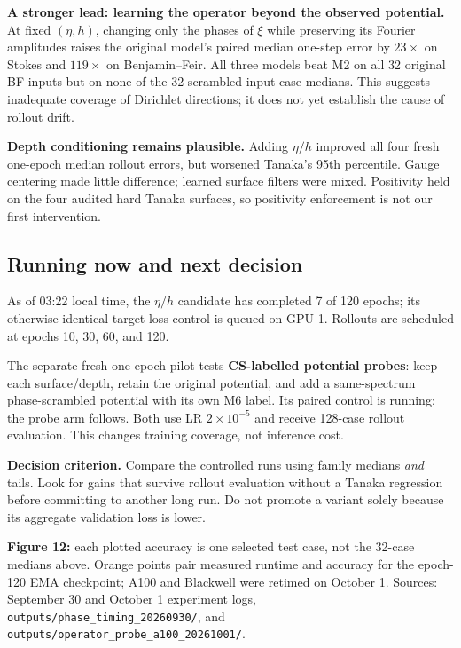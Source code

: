 \documentclass[10pt]{article}
\begin{document}
\textbf{A stronger lead: learning the operator beyond the observed potential.}
At fixed $(\eta,h)$, changing only the phases of $\xi$ while preserving its
Fourier amplitudes raises the original model's paired median one-step error
by $23\times$ on Stokes and $119\times$ on Benjamin--Feir.
All three models beat M2 on all 32 original BF inputs but on none of the
32 scrambled-input case medians. This suggests inadequate coverage of
Dirichlet directions; it does not yet establish the cause of rollout drift.

\textbf{Depth conditioning remains plausible.}
Adding $\eta/h$ improved all four fresh one-epoch median rollout errors,
but worsened Tanaka's 95th percentile. Gauge centering made little difference;
learned surface filters were mixed. Positivity held on the four audited hard
Tanaka surfaces, so positivity enforcement is not our first intervention.

\subsection*{Running now and next decision}
As of 03:22 local time, the $\eta/h$ candidate has completed 7 of 120 epochs;
its otherwise identical target-loss control is queued on GPU 1.
Rollouts are scheduled at epochs 10, 30, 60, and 120.

The separate fresh one-epoch pilot tests \textbf{CS-labelled potential probes}:
keep each surface/depth, retain the original potential, and add a same-spectrum
phase-scrambled potential with its own M6 label. Its paired control is running;
the probe arm follows. Both use LR $2\times10^{-5}$ and receive 128-case rollout
evaluation. This changes training coverage, not inference cost.

\textbf{Decision criterion.} Compare the controlled runs using family medians
\emph{and} tails. Look for gains that survive rollout evaluation without a
Tanaka regression before committing to another long run. Do not promote a
variant solely because its aggregate validation loss is lower.

{\footnotesize
\textbf{Figure 12:} each plotted accuracy is one selected test case, not the
32-case medians above. Orange points pair measured runtime and accuracy for the
epoch-120 EMA checkpoint; A100 and Blackwell were retimed on October 1.
Sources: September 30 and October 1 experiment logs,
\texttt{outputs/phase\_timing\_20260930/}, and
\texttt{outputs/operator\_probe\_a100\_20261001/}.}
\end{document}
